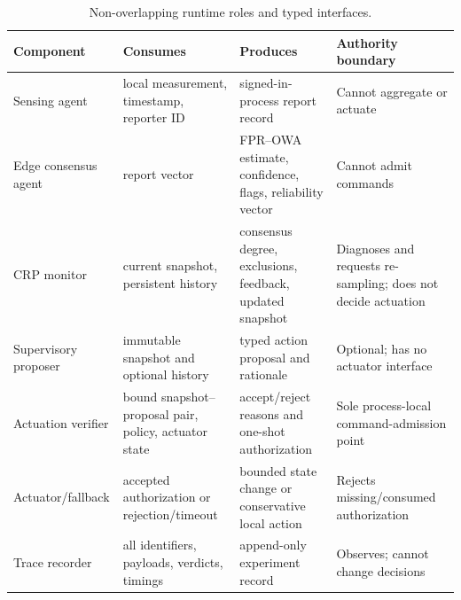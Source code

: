 \begin{table}[H]
\centering
\caption{Non-overlapping runtime roles and typed interfaces.}
\label{tab:roles}
\footnotesize
\begin{tabularx}{\textwidth}{P{0.18\textwidth}P{0.23\textwidth}YY}
\toprule
\textbf{Component} & \textbf{Consumes} & \textbf{Produces} & \textbf{Authority boundary}\\
\midrule
Sensing agent & local measurement, timestamp, reporter ID & signed-in-process report record & Cannot aggregate or actuate\\
Edge consensus agent & report vector & FPR--OWA estimate, confidence, flags, reliability vector & Cannot admit commands\\
CRP monitor & current snapshot, persistent history & consensus degree, exclusions, feedback, updated snapshot & Diagnoses and requests re-sampling; does not decide actuation\\
Supervisory proposer & immutable snapshot and optional history & typed action proposal and rationale & Optional; has no actuator interface\\
Actuation verifier & bound snapshot--proposal pair, policy, actuator state & accept/reject reasons and one-shot authorization & Sole process-local command-admission point\\
Actuator/fallback & accepted authorization or rejection/timeout & bounded state change or conservative local action & Rejects missing/consumed authorization\\
Trace recorder & all identifiers, payloads, verdicts, timings & append-only experiment record & Observes; cannot change decisions\\
\bottomrule
\end{tabularx}
\end{table}
